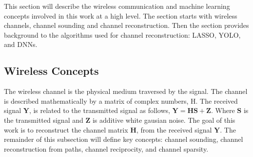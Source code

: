 This section will describe the wireless communication and machine learning concepts involved in this work at a high level. The section starts with wireless channels, channel sounding and channel reconstruction. Then the section provides background to the algorithms used for channel reconstruction: LASSO, YOLO, and DNNs.  

\subsection{Wireless Concepts}
The wireless channel is the physical medium traversed by the signal. The channel is described mathematically by a matrix of complex numbers, H. The received signal \(\textbf{Y}\), is related to the transmitted signal as follows, \(\textbf{Y} = \textbf{H} \textbf{S} + \textbf{Z} \). Where \(\textbf{S}\) is the transmitted signal and \(\textbf{Z}\) is additive white gausian noise. The goal of this work is to reconstruct the channel matrix \(\textbf{H}\), from the received signal \(\textbf{Y}\). The remainder of this subsection will define key concepts: channel sounding, channel reconstruction from paths, channel reciprocity, and channel sparsity.
